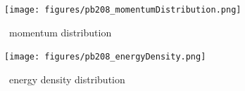 \begin{figure}[H]
    \centering
    \texttt{[image: figures/pb208\_momentumDistribution.png]}
    \caption{\pbEight\ momentum distribution}
    \label{DOMFitData_pb208_momentumDistribution}
\end{figure}

\begin{figure}[H]
    \centering
    \texttt{[image: figures/pb208\_energyDensity.png]}
    \caption{\pbEight\ energy density distribution}
    \label{DOMFitData_pb208_energyDensity}
\end{figure}
